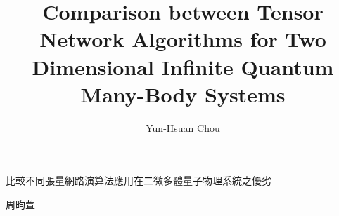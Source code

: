 

\title{Comparison between Tensor Network Algorithms for Two Dimensional Infinite Quantum Many-Body Systems}{比較不同張量網路演算法應用在二微多體量子物理系統之優劣}
\author{Yun-Hsuan Chou}{周昀萱}
